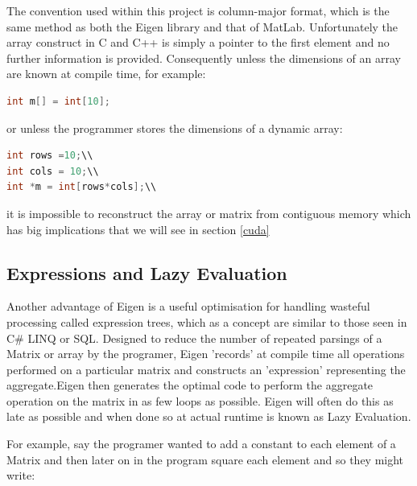 \documentclass[a4paper]{amsart}
\begin{document}
The convention used within this project is column-major format, which is the same method as both the Eigen library and that of MatLab. Unfortunately the array construct in C and C++ is simply a pointer to the first element and no further information is provided. Consequently unless the dimensions of an array are known at compile time, for example:

\begin{lstlisting}[language=C++]
int m[] = int[10];
\end{lstlisting}

or unless the programmer stores the dimensions of a dynamic array:\\

\begin{lstlisting}[language=C++]
int rows =10;\\
int cols = 10;\\
int *m = int[rows*cols];\\
\end{lstlisting}

it is impossible to reconstruct the array or matrix from contiguous memory which has big implications that we will see in section \ref{cuda}


\subsection{Expressions and Lazy Evaluation}

Another advantage of Eigen is a useful optimisation for handling wasteful processing called expression trees, which as a concept are similar to those seen in C\# LINQ or SQL. Designed to reduce the number of repeated parsings of a Matrix or array by the programer, Eigen 'records' at compile time all operations performed on a particular matrix and constructs an 'expression' representing the aggregate.Eigen then generates the optimal code to perform the aggregate operation on the matrix in as few loops as possible. Eigen will often do this as late as possible and when done so at actual runtime is known as Lazy Evaluation.

For example, say the programer wanted to add a constant to each element of a Matrix and then later on in the program square each element and so they might write:


\end{document}

